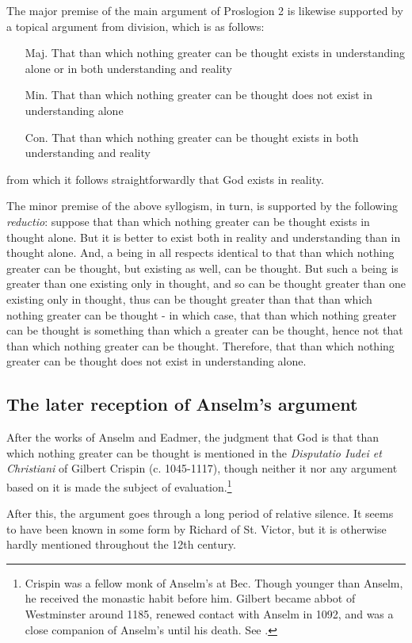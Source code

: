 \documentclass[]{amsart}
\begin{document}
The major premise of the main argument of Proslogion 2 is likewise supported by a topical argument from division, which is as follows:

\begin{itemize}
\item[Maj.] That than which nothing greater can be thought exists in understanding alone or in both understanding and reality
\item[Min.] That than which nothing greater can be thought does not exist in understanding alone
\item[Con.] That than which nothing greater can be thought exists in both understanding and reality
\end{itemize}
from which it follows straightforwardly that God exists in reality. 

The minor premise of the above syllogism, in turn, is supported by the following \textit{reductio}: suppose that than which nothing greater can be thought exists in thought alone. But it is better to exist both in reality and understanding than in thought alone. And, a being in all respects identical to that than which nothing greater can be thought, but existing as well, can be thought. But such a being is greater than one existing only in thought, and so can be thought greater than one existing only in thought, thus can be thought greater than that than which nothing greater can be thought - in which case, that than which nothing greater can be thought is something than which a greater can be thought, hence not that than which nothing greater can be thought. Therefore, that than which nothing greater can be thought does not exist in understanding alone.

\subsection{The later reception of Anselm's argument}
After the works of Anselm and Eadmer, the judgment that God is that than which nothing greater can be thought is mentioned in the \textit{Disputatio Iudei et Christiani} of Gilbert Crispin (c. 1045-1117), though neither it nor any argument based on it is made the subject of evaluation.\footnote{Crispin was a fellow monk of Anselm's at Bec. Though younger than Anselm, he received the monastic habit before him. Gilbert became abbot of Westminster around 1185, renewed contact with Anselm in 1092, and was a close companion of Anselm's until his death. See \cite[205-206]{Southern1963}.}

After this, the argument goes through a long period of relative silence. It seems to have been known in some form by Richard of St. Victor, but it is otherwise hardly mentioned throughout the 12th century.
\end{document}
